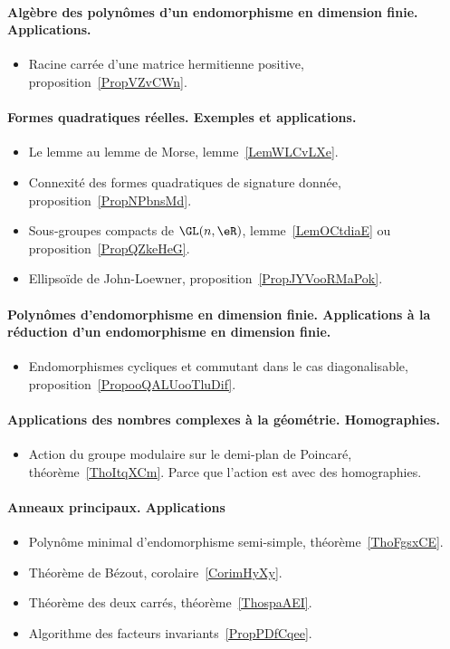 \paragraph{Algèbre des polynômes d'un endomorphisme en dimension finie. Applications.}
\begin{itemize}
	\item Racine carrée d'une matrice hermitienne positive, proposition~\ref{PropVZvCWn}.
\end{itemize}
\paragraph{Formes quadratiques réelles. Exemples et applications.}
\begin{itemize}
	\item Le lemme au lemme de Morse, lemme~\ref{LemWLCvLXe}.
	\item Connexité des formes quadratiques de signature donnée, proposition~\ref{PropNPbnsMd}.
	\item Sous-groupes compacts de \( \GL(n,\eR)\), lemme~\ref{LemOCtdiaE} ou proposition~\ref{PropQZkeHeG}.
	\item Ellipsoïde de John-Loewner, proposition~\ref{PropJYVooRMaPok}.
\end{itemize}
\paragraph{Polynômes d'endomorphisme en dimension finie. Applications à la réduction d'un endomorphisme en dimension finie.}
\begin{itemize}
	\item Endomorphismes cycliques et commutant dans le cas diagonalisable, proposition~\ref{PropooQALUooTluDif}.
\end{itemize}
\paragraph{Applications des nombres complexes à la géométrie. Homographies.}
\begin{itemize}
	\item Action du groupe modulaire sur le demi-plan de Poincaré, théorème~\ref{ThoItqXCm}. Parce que l'action est avec des homographies.
\end{itemize}

\paragraph{Anneaux principaux. Applications}
\begin{itemize}
	\item Polynôme minimal d'endomorphisme semi-simple, théorème~\ref{ThoFgsxCE}.
	\item Théorème de Bézout, corolaire~\ref{CorimHyXy}.
	\item Théorème des deux carrés, théorème~\ref{ThospaAEI}.
	\item Algorithme des facteurs invariants~\ref{PropPDfCqee}.
\end{itemize}
